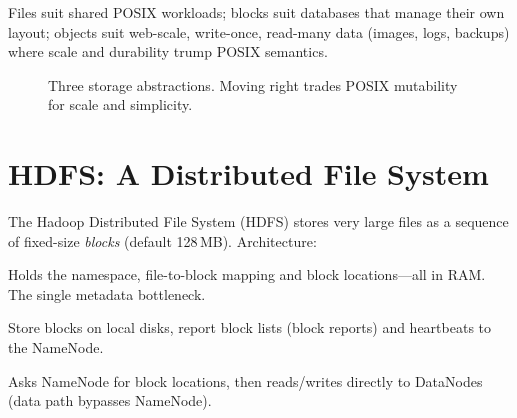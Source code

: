 Files suit shared POSIX workloads; blocks suit databases that manage their own layout; objects suit web-scale, write-once, read-many data (images, logs, backups) where scale and durability trump POSIX semantics.

\begin{figure}[h]
\centering
{}
\caption{Three storage abstractions. Moving right trades POSIX mutability for scale and simplicity.}
\label{fig:abstractions}
\end{figure}

\section{HDFS: A Distributed File System}
\label{sec:hdfs}
The Hadoop Distributed File System (HDFS) stores very large files as a sequence of fixed-size \emph{blocks} (default 128\,MB). Architecture:

\begin{description}[leftmargin=1.2em,style=nextline]
    \item[NameNode] Holds the namespace, file-to-block mapping and block locations---all in RAM. The single metadata bottleneck.
    \item[DataNodes] Store blocks on local disks, report block lists (block reports) and heartbeats to the NameNode.
    \item[Client] Asks NameNode for block locations, then reads/writes directly to DataNodes (data path bypasses NameNode).
\end{description}

